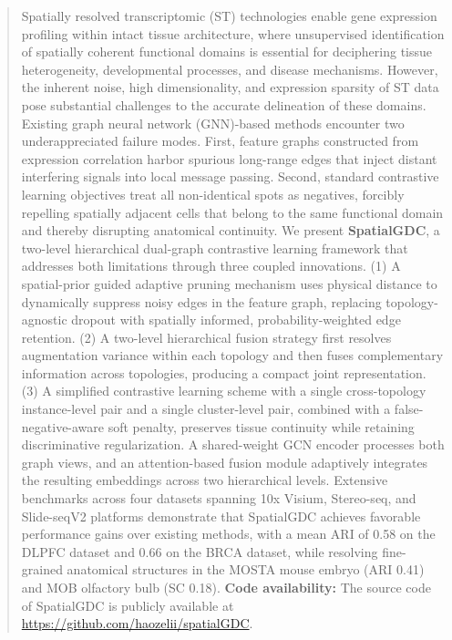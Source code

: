 \documentclass[lettersize,journal]{IEEEtran}
\begin{document}
\begin{abstract}
Spatially resolved transcriptomic (ST) technologies enable gene expression profiling within intact tissue architecture, where unsupervised identification of spatially coherent functional domains is essential for deciphering tissue heterogeneity, developmental processes, and disease mechanisms. However, the inherent noise, high dimensionality, and expression sparsity of ST data pose substantial challenges to the accurate delineation of these domains. Existing graph neural network (GNN)-based methods encounter two underappreciated failure modes. First, feature graphs constructed from expression correlation harbor spurious long-range edges that inject distant interfering signals into local message passing. Second, standard contrastive learning objectives treat all non-identical spots as negatives, forcibly repelling spatially adjacent cells that belong to the same functional domain and thereby disrupting anatomical continuity. We present \textbf{SpatialGDC}, a two-level hierarchical dual-graph contrastive learning framework that addresses both limitations through three coupled innovations. (1) A spatial-prior guided adaptive pruning mechanism uses physical distance to dynamically suppress noisy edges in the feature graph, replacing topology-agnostic dropout with spatially informed, probability-weighted edge retention. (2) A two-level hierarchical fusion strategy first resolves augmentation variance within each topology and then fuses complementary information across topologies, producing a compact joint representation. (3) A simplified contrastive learning scheme with a single cross-topology instance-level pair and a single cluster-level pair, combined with a false-negative-aware soft penalty, preserves tissue continuity while retaining discriminative regularization. A shared-weight GCN encoder processes both graph views, and an attention-based fusion module adaptively integrates the resulting embeddings across two hierarchical levels. Extensive benchmarks across four datasets spanning 10x Visium, Stereo-seq, and Slide-seqV2 platforms demonstrate that SpatialGDC achieves favorable performance gains over existing methods, with a mean ARI of 0.58 on the DLPFC dataset and 0.66 on the BRCA dataset, while resolving fine-grained anatomical structures in the MOSTA mouse embryo (ARI 0.41) and MOB olfactory bulb (SC 0.18). \textbf{Code availability:} The source code of SpatialGDC is publicly available at \url{https://github.com/haozelii/spatialGDC}.
\end{abstract}
\end{document}
